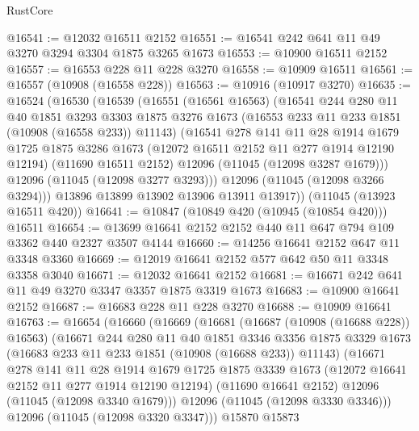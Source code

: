 \begin{lexlean}{RustCore}
\begin{coremodule}
@16541 := @12032 @16511 @2152
@16551 := @16541 @242 @641 @11 @49 @3270 @3294 @3304 @1875 @3265 @1673
@16553 := @10900 @16511 @2152
@16557 := @16553 @228 @11 @228 @3270
@16558 := @10909 @16511
@16561 := @16557 (@10908 (@16558 @228))
@16563 := @10916 (@10917 @3270)
@16635 := @16524
    (@16530
      (@16539
        (@16551
          (@16561 @16563)
          (@16541
            @244
            @280
            @11
            @40
            @1851
            @3293
            @3303
            @1875
            @3276
            @1673
            (@16553 @233 @11 @233 @1851 (@10908 (@16558 @233)) @11143)
            (@16541
              @278
              @141
              @11
              @28
              @1914
              @1679
              @1725
              @1875
              @3286
              @1673
              (@12072 @16511 @2152 @11 @277 @1914 @12190 @12194)
              (@11690 @16511 @2152)
              @12096
              (@11045 (@12098 @3287 @1679)))
            @12096
            (@11045 (@12098 @3277 @3293)))
          @12096
          (@11045 (@12098 @3266 @3294)))
        @13896
        @13899
        @13902
        @13906
        @13911
        @13917))
    (@11045 (@13923 @16511 @420))
@16641 := @10847 (@10849 @420 (@10945 (@10854 @420))) @16511
@16654 := @13699 @16641 @2152 @2152 @440 @11 @647 @794 @109 @3362 @440 @2327 @3507 @4144
@16660 := @14256 @16641 @2152 @647 @11 @3348 @3360
@16669 := @12019 @16641 @2152 @577 @642 @50 @11 @3348 @3358 @3040
@16671 := @12032 @16641 @2152
@16681 := @16671 @242 @641 @11 @49 @3270 @3347 @3357 @1875 @3319 @1673
@16683 := @10900 @16641 @2152
@16687 := @16683 @228 @11 @228 @3270
@16688 := @10909 @16641
@16763 := @16654
    (@16660
      (@16669
        (@16681
          (@16687 (@10908 (@16688 @228)) @16563)
          (@16671
            @244
            @280
            @11
            @40
            @1851
            @3346
            @3356
            @1875
            @3329
            @1673
            (@16683 @233 @11 @233 @1851 (@10908 (@16688 @233)) @11143)
            (@16671
              @278
              @141
              @11
              @28
              @1914
              @1679
              @1725
              @1875
              @3339
              @1673
              (@12072 @16641 @2152 @11 @277 @1914 @12190 @12194)
              (@11690 @16641 @2152)
              @12096
              (@11045 (@12098 @3340 @1679)))
            @12096
            (@11045 (@12098 @3330 @3346)))
          @12096
          (@11045 (@12098 @3320 @3347)))
        @15870
        @15873

\end{coremodule}
\end{lexlean}
